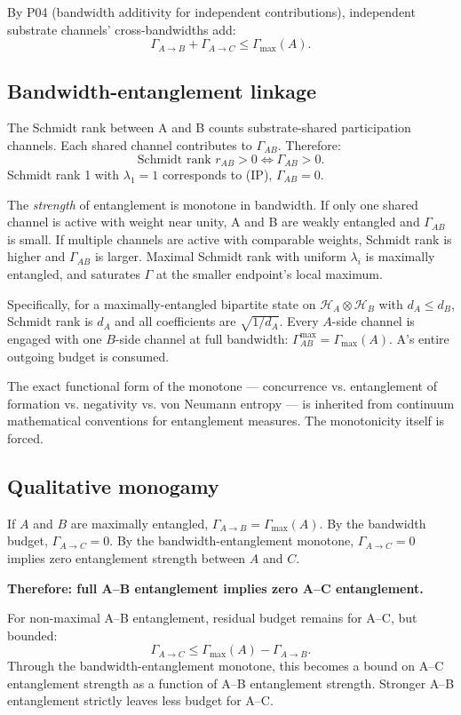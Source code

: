 \documentclass[11pt,a4paper]{article}
\begin{document}
By P04 (bandwidth additivity for independent contributions), independent substrate channels' cross-bandwidths add:
\[
\Gamma_{A \to B} + \Gamma_{A \to C} \leq \Gamma_{\max}(A).
\]

\subsection{Bandwidth-entanglement linkage}

The Schmidt rank between A and B counts substrate-shared participation channels. Each shared channel contributes to $\Gamma_{AB}$. Therefore:
\[
\text{Schmidt rank } r_{AB} > 0 \iff \Gamma_{AB} > 0.
\]
Schmidt rank 1 with $\lambda_1 = 1$ corresponds to (IP), $\Gamma_{AB} = 0$.

The \emph{strength} of entanglement is monotone in bandwidth. If only one shared channel is active with weight near unity, A and B are weakly entangled and $\Gamma_{AB}$ is small. If multiple channels are active with comparable weights, Schmidt rank is higher and $\Gamma_{AB}$ is larger. Maximal Schmidt rank with uniform $\lambda_i$ is maximally entangled, and saturates $\Gamma$ at the smaller endpoint's local maximum.

Specifically, for a maximally-entangled bipartite state on $\mathcal{H}_A \otimes \mathcal{H}_B$ with $d_A \leq d_B$, Schmidt rank is $d_A$ and all coefficients are $\sqrt{1/d_A}$. Every $A$-side channel is engaged with one $B$-side channel at full bandwidth: $\Gamma_{AB}^{\max} = \Gamma_{\max}(A)$. A's entire outgoing budget is consumed.

The exact functional form of the monotone --- concurrence vs. entanglement of formation vs. negativity vs. von Neumann entropy --- is inherited from continuum mathematical conventions for entanglement measures. The monotonicity itself is forced.

\subsection{Qualitative monogamy}

If $A$ and $B$ are maximally entangled, $\Gamma_{A \to B} = \Gamma_{\max}(A)$. By the bandwidth budget, $\Gamma_{A \to C} = 0$. By the bandwidth-entanglement monotone, $\Gamma_{A \to C} = 0$ implies zero entanglement strength between $A$ and $C$.

\textbf{Therefore: full A--B entanglement implies zero A--C entanglement.}

For non-maximal A--B entanglement, residual budget remains for A--C, but bounded:
\[
\Gamma_{A \to C} \leq \Gamma_{\max}(A) - \Gamma_{A \to B}.
\]
Through the bandwidth-entanglement monotone, this becomes a bound on A--C entanglement strength as a function of A--B entanglement strength. Stronger A--B entanglement strictly leaves less budget for A--C.
\end{document}

